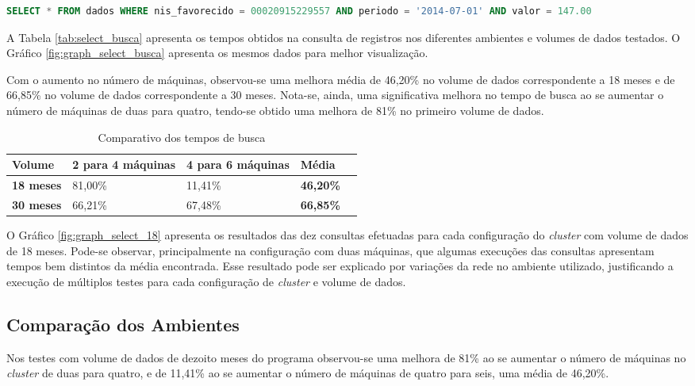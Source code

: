 \begin{lstlisting}[caption={Consulta CQL},label={lst:cql_select},language=SQL]
SELECT * FROM dados WHERE nis_favorecido = 00020915229557 AND periodo = '2014-07-01' AND valor = 147.00 
\end{lstlisting}

A Tabela \ref{tab:select_busca} apresenta os tempos obtidos na consulta de registros nos diferentes ambientes e volumes de dados testados. O Gráfico \ref{fig:graph_select_busca} apresenta os mesmos dados para melhor visualização.

Com o aumento no número de máquinas, observou-se uma melhora média de 46,20\% no volume de dados correspondente a 18 meses e de 66,85\% no volume de dados correspondente a 30 meses. Nota-se, ainda, uma significativa melhora no tempo de busca ao se aumentar o número de máquinas de duas para quatro, tendo-se obtido uma melhora de 81\% no primeiro volume de dados.

\begin{table}[]
	\centering
	\caption{Comparativo dos tempos de busca}
	\label{tb:comparativo_select}
	\begin{tabular}{lllll}
		\textbf{Volume} 	& \textbf{2 para 4 máquinas} & \textbf{4 para 6 máquinas}  & \textbf{Média}   &  \\ \hline
		\textbf{18 meses} 	& 81,00\%                    & 11,41\%                     & \textbf{46,20\%} &  \\ \hline
		\textbf{30 meses}	& 66,21\%                    & 67,48\%                     & \textbf{66,85\%} &  \\ \hline
	\end{tabular}
\end{table}

O Gráfico \ref{fig:graph_select_18} apresenta os resultados das dez consultas efetuadas para cada configuração do \emph{cluster} com volume de dados de 18 meses. Pode-se observar, principalmente na configuração com duas máquinas, que algumas execuções das consultas apresentam tempos bem distintos da média encontrada. Esse resultado pode ser explicado por variações da rede no ambiente utilizado, justificando a execução de múltiplos testes para cada configuração de \emph{cluster} e volume de dados. 


\subsection{Comparação dos Ambientes}
Nos testes com volume de dados de dezoito meses do programa observou-se uma melhora de 81\% ao se aumentar o número de máquinas no \emph{cluster} de duas para quatro, e de 11,41\% ao se aumentar o número de máquinas de quatro para seis, uma média de 46,20\%. 

